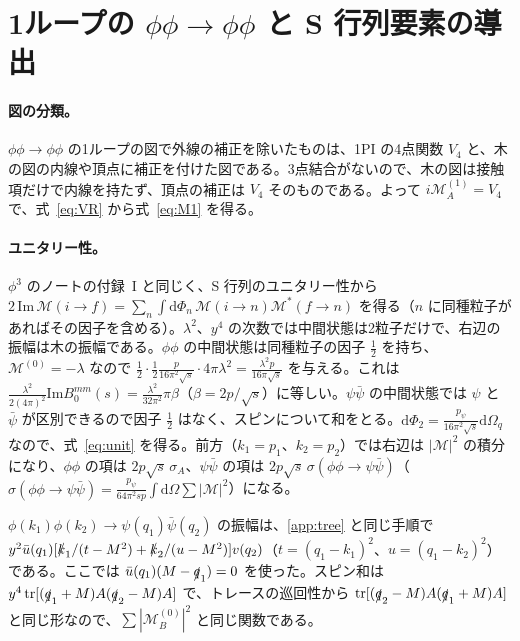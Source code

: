 \documentclass[a4paper,10pt]{ltjsarticle}
\newcommand{\dd}{\mathrm{d}}
\begin{document}
\section{1ループの $\phi\phi\to\phi\phi$ と S 行列要素の導出}\label{app:scat}

\paragraph{図の分類。}$\phi\phi\to\phi\phi$ の1ループの図で外線の補正を除いたものは、1PI の4点関数 $V_4$ と、木の図の内線や頂点に補正を付けた図である。3点結合がないので、木の図は接触項だけで内線を持たず、頂点の補正は $V_4$ そのものである。よって $i\mathcal M_A^{(1)}=V_4$ で、式~\eqref{eq:VR} から式~\eqref{eq:M1} を得る。

\paragraph{ユニタリー性。}$\phi^3$ のノートの付録~I と同じく、S 行列のユニタリー性から $2\,\mathrm{Im}\,\mathcal M(i\to f)=\sum_n\int\dd\Phi_n\,\mathcal M(i\to n)\mathcal M^*(f\to n)$ を得る（$n$ に同種粒子があればその因子を含める）。$\lambda^2$、$y^4$ の次数では中間状態は2粒子だけで、右辺の振幅は木の振幅である。$\phi\phi$ の中間状態は同種粒子の因子 $\frac12$ を持ち、$\mathcal M^{(0)}=-\lambda$ なので $\frac12\cdot\frac12\frac{p}{16\pi^2\sqrt s}\cdot4\pi\lambda^2=\frac{\lambda^2p}{16\pi\sqrt s}$ を与える。これは $\frac{\lambda^2}{2(4\pi)^2}\mathrm{Im}B_0^{mm}(s)=\frac{\lambda^2}{32\pi^2}\pi\beta$（$\beta=2p/\sqrt s$）に等しい。$\psi\bar\psi$ の中間状態では $\psi$ と $\bar\psi$ が区別できるので因子 $\frac12$ はなく、スピンについて和をとる。$\dd\Phi_2=\frac{p_\psi}{16\pi^2\sqrt s}\dd\Omega_q$ なので、式~\eqref{eq:unit} を得る。前方（$k_1=p_1$、$k_2=p_2$）では右辺は $|\mathcal M|^2$ の積分になり、$\phi\phi$ の項は $2p\sqrt s\,\sigma_A$、$\psi\bar\psi$ の項は $2p\sqrt s\,\sigma(\phi\phi\to\psi\bar\psi)$（$\sigma(\phi\phi\to\psi\bar\psi)=\frac{p_\psi}{64\pi^2sp}\int\dd\Omega\sum|\mathcal M|^2$）になる。

$\phi(k_1)\phi(k_2)\to\psi(q_1)\bar\psi(q_2)$ の振幅は、\ref{app:tree} と同じ手順で $y^2\bar u(q_1)[\slashed k_1/(t-M^2)+\slashed k_2/(u-M^2)]v(q_2)$（$t=(q_1-k_1)^2$、$u=(q_1-k_2)^2$）である。ここでは $\bar u(q_1)(M-\slashed q_1)=0$ を使った。スピン和は $y^4\,\mathrm{tr}[(\slashed q_1+M)A(\slashed q_2-M)A]$ で、トレースの巡回性から $\mathrm{tr}[(\slashed q_2-M)A(\slashed q_1+M)A]$ と同じ形なので、$\sum|\mathcal M_B^{(0)}|^2$ と同じ関数である。
\end{document}
